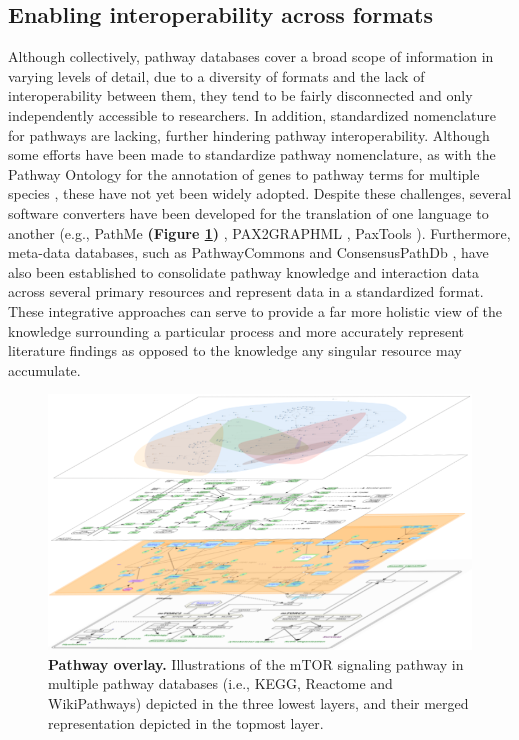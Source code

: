 \subsection{Enabling interoperability across formats}

Although collectively, pathway databases cover a broad scope of information in varying levels of detail, due to a diversity of formats and the lack of interoperability between them, they tend to be fairly disconnected and only independently accessible to researchers. In addition, standardized nomenclature for pathways are lacking, further hindering pathway interoperability. Although some efforts have been made to standardize pathway nomenclature, as with the Pathway Ontology for the annotation of genes to pathway terms for multiple species \parencite{petri2014}, these have not yet been widely adopted. Despite these challenges, several software converters have been developed for the translation of one language to another (e.g., PathMe  \textbf{(Figure \ref{overlay})} \parencite{domingo2019}, PAX2GRAPHML \parencite{moreews2021}, PaxTools \parencite{demir2013}). Furthermore, meta-data databases, such as PathwayCommons \parencite{rodchenkov2020} and ConsensusPathDb \parencite{herwig2016}, have also been established to consolidate pathway knowledge and interaction data across several primary resources and represent data in a standardized format. These integrative approaches can serve to provide a far more holistic view of the knowledge surrounding a particular process and more accurately represent literature findings as opposed to the knowledge any singular resource may accumulate. 

{\footnotesize
\begin{figure}[ht]
	\centering
		\includegraphics[width=\linewidth]{figures/pathway_overlay.png}
	\caption{\footnotesize \textbf{Pathway overlay.}  Illustrations of the mTOR signaling pathway in multiple pathway databases (i.e., KEGG, Reactome  and WikiPathways) depicted in the three lowest layers, and their merged representation depicted in the topmost layer.}
    \label{overlay}
\end{figure}
}


